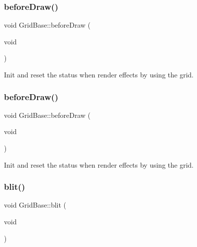 \mbox{\label{classGridBase_a975ccffbff789ff39092cb9dceb99657}} 
\subsubsection{\texorpdfstring{before\+Draw()}{beforeDraw()}\hspace{0.1cm}{\footnotesize\ttfamily [1/2]}}
{\footnotesize\ttfamily void Grid\+Base\+::before\+Draw (\begin{DoxyParamCaption}\item[{void}]{ }\end{DoxyParamCaption})}

Init and reset the status when render effects by using the grid. \mbox{\label{classGridBase_a975ccffbff789ff39092cb9dceb99657}} 
\subsubsection{\texorpdfstring{before\+Draw()}{beforeDraw()}\hspace{0.1cm}{\footnotesize\ttfamily [2/2]}}
{\footnotesize\ttfamily void Grid\+Base\+::before\+Draw (\begin{DoxyParamCaption}\item[{void}]{ }\end{DoxyParamCaption})}

Init and reset the status when render effects by using the grid. \mbox{\label{classGridBase_af0d708ad2c3be26a6b74e27ec732b543}} 
\subsubsection{\texorpdfstring{blit()}{blit()}\hspace{0.1cm}{\footnotesize\ttfamily [1/2]}}
{\footnotesize\ttfamily void Grid\+Base\+::blit (\begin{DoxyParamCaption}\item[{void}]{ }\end{DoxyParamCaption})\hspace{0.3cm}{\ttfamily [virtual]}}


